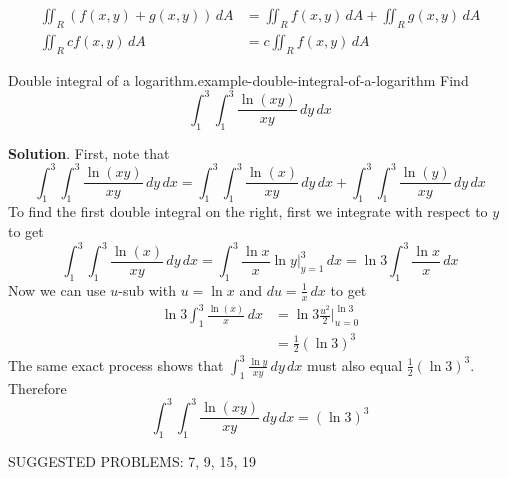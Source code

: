 \documentclass[10pt,]{book}
\numberwithin{equation}{section}
\begin{document}
\begin{align*}
\iint_{R}(f(x,y) + g(x,y))\,dA & = \iint_{R}f(x,y)\,dA + \iint_{R}g(x,y)\,dA \\
\iint_{R}cf(x,y)\,dA & = c\iint_{R}f(x,y)\,dA 
\end{align*}
%
\begin{example}{Double integral of a logarithm.}{example-double-integral-of-a-logarithm}%
\hypertarget{p-1468}{}%
Find%
\begin{equation*}
\int_{1}^{3}\int_{1}^{3}\frac{\ln(xy)}{xy}\,dy\,dx
\end{equation*}
%
\par\smallskip%
\noindent\textbf{Solution}.\hypertarget{solution-240}{}\quad%
First, note that%
\begin{equation*}
\int_{1}^{3}\int_{1}^{3}\frac{\ln(xy)}{xy}\,dy\,dx = \int_{1}^{3}\int_{1}^{3}\frac{\ln(x)}{xy}\,dy\,dx + \int_{1}^{3}\int_{1}^{3}\frac{\ln(y)}{xy}\,dy\,dx
\end{equation*}
To find the first double integral on the right, first we integrate with respect to \(y\) to get%
\begin{equation*}
\int_{1}^{3}\int_{1}^{3}\frac{\ln(x)}{xy}\,dy\,dx = \int_{1}^{3}\frac{\ln x}{x}\ln y\big|_{y=1}^{3}\,dx = \ln 3\int_{1}^{3}\frac{\ln x}{x}\,dx
\end{equation*}
Now we can use \(u\)-sub with \(u = \ln x\) and \(du = \frac{1}{x}\,dx\) to get%
\begin{align*}
\ln3\int_{1}^{3}\frac{\ln(x)}{x}\,dx & = \ln3 \frac{u^{2}}{2}\big|_{u=0}^{\ln 3} \\
& = \frac{1}{2}(\ln3)^{3} 
\end{align*}
The same exact process shows that \(\int_{1}^{3}\frac{\ln y}{xy}\,dy\,dx\) must also equal \(\frac{1}{2}(\ln3)^{3}\). Therefore%
\begin{equation*}
\int_{1}^{3}\int_{1}^{3}\frac{\ln(xy)}{xy}\,dy\,dx = (\ln3)^{3}
\end{equation*}
\end{example}
\begin{conclusion}{}%
\hypertarget{p-1469}{}%
SUGGESTED PROBLEMS: 7, 9, 15, 19%
\end{conclusion}%
%
%
\typeout{************************************************}
\typeout{************************************************}
%
\end{document}

